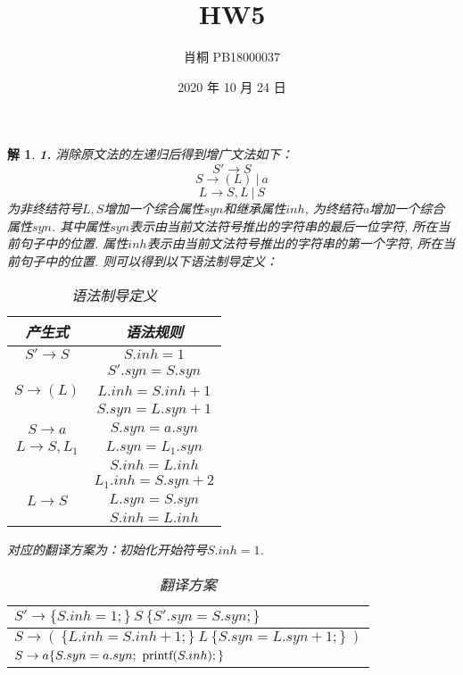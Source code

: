 \documentclass{article}
\begin{document}
	\title{HW5}
	\author{肖桐 PB18000037}
	\date{2020 年 10 月 24 日}
	\maketitle

	\newtheorem*{solution}{解}

	\begin{solution}\textnormal{\textbf{1.}}
		消除原文法的左递归后得到增广文法如下：
		$$
		S' \to S
		$$
		$$
		S \to (L)\ |\ a
		$$
		$$
		L \to S,L\ |\ S
		$$
		为非终结符号$L, S$增加一个综合属性$syn$和继承属性$inh$, 为终结符$a$增加一个综合属性$syn$.\newline
		其中属性$syn$表示由当前文法符号推出的字符串的最后一位字符, 所在当前句子中的位置.\newline
		属性$inh$表示由当前文法符号推出的字符串的第一个字符, 所在当前句子中的位置.\newline
		则可以得到以下语法制导定义：
		\begin{table}[H]
			\centering
			\caption{语法制导定义}
			\begin{tabular}{|c|c|}
				\hline
				产生式 & 语法规则 \\
				\hline
				$S' \to S$ & $S.inh = 1$ \\
				& $S'.syn = S.syn$ \\
				\hline
				$S \to (L)$ & $L.inh = S.inh + 1$ \\
				& $S.syn = L.syn + 1$ \\
				\hline
				$S \to a$ & $S.syn = a.syn$ \\
				\hline
				$L \to S, L_1$ & $L.syn = L_1.syn$ \\
				& $S.inh = L.inh$ \\
				& $L_1.inh = S.syn + 2$ \\
				\hline
				$L \to S$ & $L.syn = S.syn$ \\
				& $S.inh = L.inh$ \\
				\hline
			\end{tabular}
		\end{table}
		对应的翻译方案为：初始化开始符号$S.inh = 1$.
		\begin{table}[H]
			\centering
			\caption{翻译方案}
			\begin{tabular}{|l|}
				\hline
				$S' \to \{S.inh = 1;\}\ S\ \{S'.syn = S.syn;\}$ \\
				\hline
				$S \to (\ \{L.inh = S.inh + 1;\}\ L\ \{S.syn = L.syn + 1;\}\ )$ \\
				\hline
				$S \to a\{S.syn = a.syn;\ \textnormal{printf}(S.inh);\}$ \\

\end{tabular}
\end{table}
\end{solution}
\end{document}
